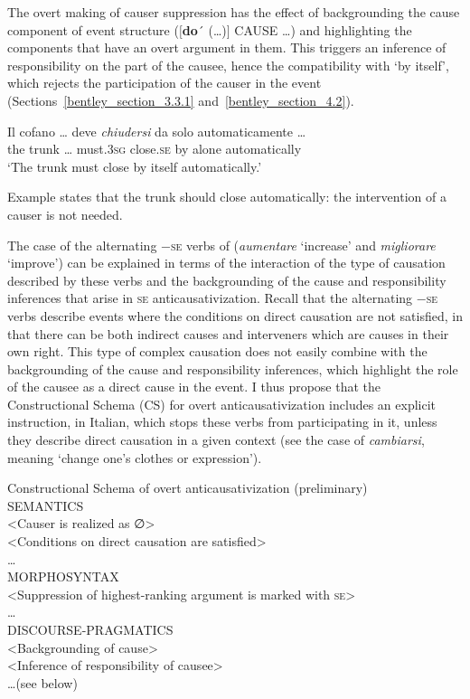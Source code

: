 \documentclass[output=paper,colorlinks,citecolor=brown
]{langscibook}
\begin{document}
The overt making of causer suppression has the effect of backgrounding the cause component of event structure ($\lbrack$\textbf{do}´ (\ldots)$\rbrack$ CAUSE \ldots) and highlighting the components that have an overt argument in them. This triggers an inference of responsibility on the part of the causee, hence the compatibility with ‘by itself’, which rejects the participation of the causer in the event (Sections~\ref{bentley_section_3.3.1} and~\ref{bentley_section_4.2}). 

\ea \label{bentley_example_53}
\gll Il		cofano  {\ldots} 		deve					\textit{chiudersi} da		solo		automaticamente {\ldots}\\
	the	trunk	{\ldots}						must.3\textsc{sg}		close.\textsc{se}			by	alone	automatically\\
\glt ‘The trunk must close by itself automatically.’
\z

Example  states that the trunk should close automatically: the intervention of a causer is not needed. 

The case of the alternating −\textsc{se} verbs of  (\textit{aumentare} ‘increase’ and \textit{migliorare} ‘improve’) can be explained in terms of the interaction of the type of causation described by these verbs and the backgrounding of the cause and responsibility inferences that arise in \textsc{se} anticausativization. Recall that the alternating −\textsc{se} verbs describe events where the conditions on direct causation are not satisfied, in that there can be both indirect causes and interveners which are causes in their own right. This type of complex causation does not easily combine with the backgrounding of the cause and responsibility inferences, which highlight the role of the causee as a direct cause in the event. I thus propose that the Constructional Schema (CS) for overt anticausativization includes an explicit instruction, in Italian, which stops these verbs from participating in it, unless they describe direct causation in a given context (see the case of \textit{cambiarsi}, meaning ‘change one’s clothes or expression’).

\ea \label{bentley_example_54}
Constructional Schema of overt anticausativization (preliminary)\\
SEMANTICS\\
<Causer is realized as ∅>\\
<Conditions on direct causation are satisfied>\\
 \ldots \\
MORPHOSYNTAX\\
<Suppression of highest-ranking argument is marked with \textsc{se}>\\
 \ldots \\
DISCOURSE-PRAGMATICS\\
<Backgrounding of cause>\\
<Inference of responsibility of causee>\\
 \ldots  (see below)
\z
\end{document}
